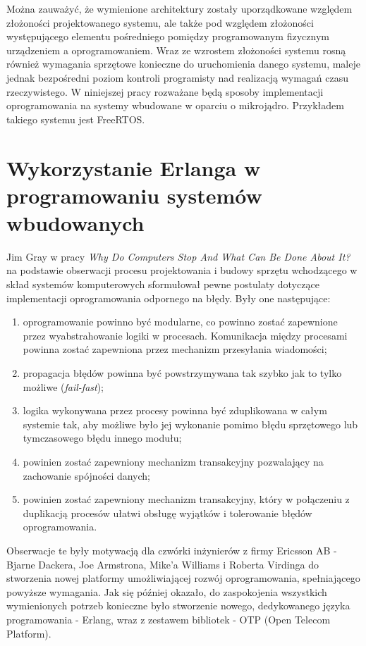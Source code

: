 Można zauważyć, że wymienione architektury zostały uporządkowane względem złożoności projektowanego systemu, ale także pod względem złożoności występującego elementu pośredniego pomiędzy programowanym fizycznym urządzeniem a oprogramowaniem. Wraz ze wzrostem złożoności systemu rosną również wymagania sprzętowe konieczne do uruchomienia danego systemu, maleje jednak bezpośredni poziom kontroli programisty nad realizacją wymagań czasu rzeczywistego.
W niniejszej pracy rozważane będą sposoby implementacji oprogramowania na systemy wbudowane w oparciu o mikrojądro. Przykładem takiego systemu jest FreeRTOS.


\section{Wykorzystanie Erlanga w programowaniu systemów wbudowanych}
\label{sec:jezykiFunkcyjne}

Jim Gray w pracy \emph{Why Do Computers Stop And What Can Be Done About It?} \cite{Gray85whydo} na podstawie obserwacji procesu projektowania i budowy sprzętu wchodzącego w skład systemów komputerowych sformułował pewne postulaty dotyczące implementacji oprogramowania odpornego na błędy.
Były one następujące:
\begin{enumerate}
\item oprogramowanie powinno być modularne, co powinno zostać zapewnione przez wyabstrahowanie logiki w procesach. Komunikacja między procesami powinna zostać zapewniona przez mechanizm przesyłania wiadomości;
\item propagacja błędów powinna być powstrzymywana tak szybko jak to tylko możliwe (\emph{fail-fast});
\item logika wykonywana przez procesy powinna być zduplikowana w całym systemie tak, aby możliwe było jej wykonanie pomimo błędu sprzętowego lub tymczasowego błędu innego modułu;
\item powinien zostać zapewniony mechanizm transakcyjny pozwalający na zachowanie spójności danych;
\item powinien zostać zapewniony mechanizm transakcyjny, który w połączeniu z duplikacją procesów ułatwi obsługę wyjątków i tolerowanie błędów oprogramowania.
\end{enumerate}

Obserwacje te były motywacją dla czwórki inżynierów z firmy Ericsson AB - Bjarne Dackera, Joe Armstrona, Mike'a Williams i Roberta Virdinga do stworzenia nowej platformy umożliwiającej rozwój oprogramowania, spełniającego powyższe wymagania.
Jak się później okazało, do zaspokojenia wszystkich wymienionych potrzeb konieczne było stworzenie nowego, dedykowanego języka programowania - Erlang, wraz z zestawem bibliotek - OTP (Open Telecom Platform).

